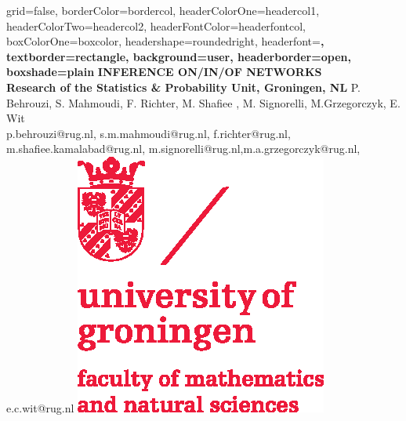 \documentclass[a0paper,portrait]{baposter}
\begin{document}
\begin{poster}{
grid=false,
borderColor=bordercol, %
headerColorOne=headercol1, %
headerColorTwo=headercol2, %
headerFontColor=headerfontcol, %
boxColorOne=boxcolor, %
headershape=roundedright, %
headerfont=\Large\sf\bf, %
textborder=rectangle,
background=user,
headerborder=open, %
boxshade=plain
}
{}
%
%
{\sf\bf  INFERENCE ON/IN/OF NETWORKS \\ {\small Research of the Statistics \& Probability Unit, Groningen, NL}} %
{\vspace{1em} P. Behrouzi, S. Mahmoudi, F. Richter, M. Shafiee , M. Signorelli, M.Grzegorczyk, E. Wit \\ %
{\footnotesize p.behrouzi@rug.nl, s.m.mahmoudi@rug.nl, f.richter@rug.nl, m.shafiee.kamalabad@rug.nl, m.signorelli@rug.nl,m.a.grzegorczyk@rug.nl, e.c.wit@rug.nl}} %
{\includegraphics[scale=0.5]{logo.eps}} %



\end{poster}
\end{document}
